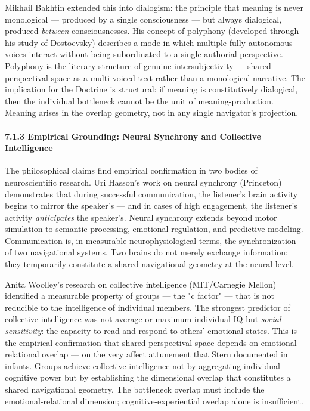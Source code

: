 Mikhail Bakhtin extended this into dialogism: the principle that meaning is never monological — produced by a single consciousness — but always dialogical, produced \textit{between} consciousnesses. His concept of polyphony (developed through his study of Dostoevsky) describes a mode in which multiple fully autonomous voices interact without being subordinated to a single authorial perspective. Polyphony is the literary structure of genuine intersubjectivity — shared perspectival space as a multi-voiced text rather than a monological narrative. The implication for the Doctrine is structural: if meaning is constitutively dialogical, then the individual bottleneck cannot be the unit of meaning-production. Meaning arises in the overlap geometry, not in any single navigator's projection.


\paragraph*{7.1.3 Empirical Grounding: Neural Synchrony and Collective Intelligence}


The philosophical claims find empirical confirmation in two bodies of neuroscientific research. Uri Hasson's work on neural synchrony (Princeton) demonstrates that during successful communication, the listener's brain activity begins to mirror the speaker's — and in cases of high engagement, the listener's activity \textit{anticipates} the speaker's. Neural synchrony extends beyond motor simulation to semantic processing, emotional regulation, and predictive modeling. Communication is, in measurable neurophysiological terms, the synchronization of two navigational systems. Two brains do not merely exchange information; they temporarily constitute a shared navigational geometry at the neural level.


Anita Woolley's research on collective intelligence (MIT/\allowbreak Carnegie Mellon) identified a measurable property of groups — the "c factor" — that is not reducible to the intelligence of individual members. The strongest predictor of collective intelligence was not average or maximum individual IQ but \textit{social sensitivity}: the capacity to read and respond to others' emotional states. This is the empirical confirmation that shared perspectival space depends on emotional-relational overlap — on the very affect attunement that Stern documented in infants. Groups achieve collective intelligence not by aggregating individual cognitive power but by establishing the dimensional overlap that constitutes a shared navigational geometry. The bottleneck overlap must include the emotional-relational dimension; cognitive-experiential overlap alone is insufficient.


